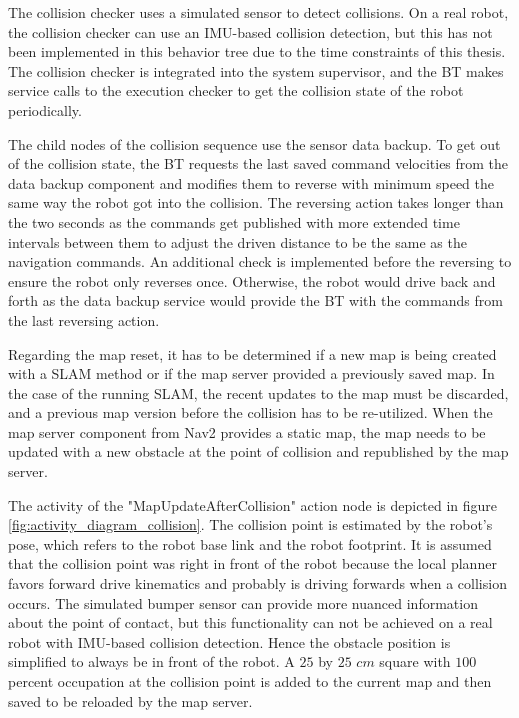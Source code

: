 The collision checker uses a simulated sensor to detect collisions. On a real robot, the collision checker can use an IMU-based collision detection, but this has not been implemented in this behavior tree due to the time constraints of this thesis. The collision checker is integrated into the system supervisor, and the BT makes service calls to the execution checker to get the collision state of the robot periodically. 

The child nodes of the collision sequence use the sensor data backup. To get out of the collision state, the BT requests the last saved command velocities from the data backup component and modifies them to reverse with minimum speed the same way the robot got into the collision. The reversing action takes longer than the two seconds as the commands get published with more extended time intervals between them to adjust the driven distance to be the same as the navigation commands. An additional check is implemented before the reversing to ensure the robot only reverses once. Otherwise, the robot would drive back and forth as the data backup service would provide the BT with the commands from the last reversing action. 

%

Regarding the map reset, it has to be determined if a new map is being created with a SLAM method or if the map server provided a previously saved map. In the case of the running SLAM, the recent updates to the map must be discarded, and a previous map version before the collision has to be re-utilized. When the map server component from Nav2 provides a static map, the map needs to be updated with a new obstacle at the point of collision and republished by the map server. 

The activity of the "MapUpdateAfterCollision" action node is depicted in figure \ref{fig:activity_diagram_collision}. The collision point is estimated by the robot's pose, which refers to the robot base link and the robot footprint. It is assumed that the collision point was right in front of the robot because the local planner favors forward drive kinematics and probably is driving forwards when a collision occurs. The simulated bumper sensor can provide more nuanced information about the point of contact, but this functionality can not be achieved on a real robot with IMU-based collision detection. Hence the obstacle position is simplified to always be in front of the robot. A $25$ by $25$ $cm$ square with $100$ percent occupation at the collision point is added to the current map and then saved to be reloaded by the map server. 

